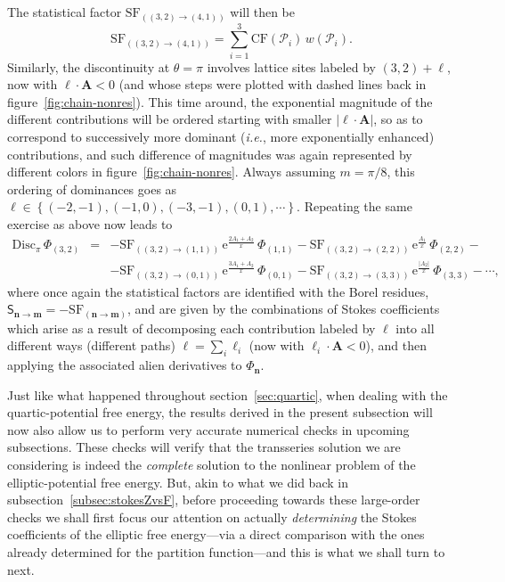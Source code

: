 \documentclass[11pt,a4paper]{article}
\newcommand{\be}{\begin{equation}}
\newcommand{\ee}{\end{equation}}
\def\disc{{\mathrm{Disc}}}
\begin{document}
%
\noindent
The statistical factor $\mathrm{SF}_{( (3,2) \rightarrow (4,1) )}$ will then be
%
\be
\mathrm{SF}_{( (3,2) \rightarrow (4,1) )} = \sum_{i=1}^3 \mathrm{CF} (\mathcal{P}_i)\, w (\mathcal{P}_i).
\ee
%
\noindent
Similarly, the discontinuity at $\theta=\pi$ involves lattice sites labeled by $(3,2) + \boldsymbol{\ell}$, now with $\boldsymbol{\ell} \cdot \boldsymbol{A} < 0$ (and whose steps were plotted with dashed lines back in figure~\ref{fig:chain-nonres}). This time around, the exponential magnitude of the different contributions will be ordered starting with smaller $\left| \boldsymbol{\ell} \cdot \boldsymbol{A} \right|$, so as to correspond to successively more dominant (\textit{i.e.}, more exponentially enhanced) contributions, and such difference of magnitudes was again represented by different colors in figure~\ref{fig:chain-nonres}. Always assuming $m=\pi/8$, this ordering of dominances goes as $\boldsymbol{\ell} \in \left\{ (-2,-1), (-1,0), (-3,-1), (0,1), \cdots \right\}$. Repeating the same exercise as above now leads to
%
\begin{eqnarray}
\disc_\pi\,\Phi_{(3,2)} &=& - \mathrm{SF}_{( (3,2) \rightarrow (1,1) )}\, \mathrm{e}^{\frac{2A_1+A_2}{x}}\, \Phi_{(1,1)} - \mathrm{SF}_{( (3,2) \rightarrow (2,2) )}\, \mathrm{e}^{\frac{A_1}{x}}\, \Phi_{(2,2)} - \nonumber \\
&& - \mathrm{SF}_{( (3,2) \rightarrow (0,1) )}\, \mathrm{e}^{\frac{3A_1+A_2}{x}}\,  \Phi_{(0,1)} - \mathrm{SF}_{( (3,2) \rightarrow (3,3) )}\, \mathrm{e}^{\frac{|A_2|}{x}}\,  \Phi_{(3,3)} - \cdots,
\label{eq:disc-32-nonres-pi}
\end{eqnarray}
%
\noindent
where once again the statistical factors are identified with the Borel residues, $\mathsf{S}_{\boldsymbol{n}\rightarrow\boldsymbol{m}} = - \mathrm{SF}_{( \boldsymbol{n}\rightarrow\boldsymbol{m} )}$, and are given by the combinations of Stokes coefficients which arise as a result of decomposing each contribution labeled by $\boldsymbol{\ell}$ into all different ways (different paths) $\boldsymbol{\ell} = \sum_i \boldsymbol{\ell}_i$ (now with $\boldsymbol{\ell}_i \cdot \boldsymbol{A} < 0$), and then applying the associated alien derivatives to $\Phi_{\boldsymbol{n}}$.

Just like what happened throughout section~\ref{sec:quartic}, when dealing with the quartic-potential free energy, the results derived in the present subsection will now also allow us to perform very accurate numerical checks in upcoming subsections. These checks will verify that the transseries solution we are considering is indeed the \textit{complete} solution to the nonlinear problem of the elliptic-potential free energy. But, akin to what we did back in subsection~\ref{subsec:stokesZvsF}, before proceeding towards these large-order checks we shall first focus our attention on actually \textit{determining} the Stokes coefficients of the elliptic free energy---via a direct comparison with the ones already determined for the partition function---and this is what we shall turn to next.
\end{document}
